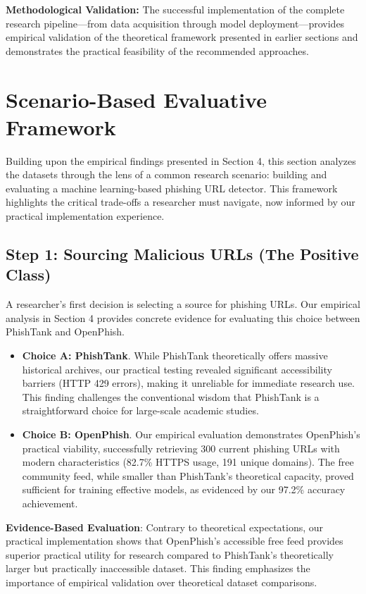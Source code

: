 \documentclass[journal,article,submit,pdftex,moreauthors]{Definitions/mdpi}
\begin{document}
\textbf{Methodological Validation:} The successful implementation of the complete research pipeline—from data acquisition through model deployment—provides empirical validation of the theoretical framework presented in earlier sections and demonstrates the practical feasibility of the recommended approaches.

\section{Scenario-Based Evaluative Framework}

Building upon the empirical findings presented in Section 4, this section analyzes the datasets through the lens of a common research scenario: building and evaluating a machine learning-based phishing URL detector. This framework highlights the critical trade-offs a researcher must navigate, now informed by our practical implementation experience.

\subsection{Step 1: Sourcing Malicious URLs (The Positive Class)}

A researcher's first decision is selecting a source for phishing URLs. Our empirical analysis in Section 4 provides concrete evidence for evaluating this choice between PhishTank and OpenPhish.

\begin{itemize}
\item \textbf{Choice A: PhishTank}. While PhishTank theoretically offers massive historical archives, our practical testing revealed significant accessibility barriers (HTTP 429 errors), making it unreliable for immediate research use. This finding challenges the conventional wisdom that PhishTank is a straightforward choice for large-scale academic studies.
\item \textbf{Choice B: OpenPhish}. Our empirical evaluation demonstrates OpenPhish's practical viability, successfully retrieving 300 current phishing URLs with modern characteristics (82.7\% HTTPS usage, 191 unique domains). The free community feed, while smaller than PhishTank's theoretical capacity, proved sufficient for training effective models, as evidenced by our 97.2\% accuracy achievement.
\end{itemize}

\textbf{Evidence-Based Evaluation}: Contrary to theoretical expectations, our practical implementation shows that OpenPhish's accessible free feed provides superior practical utility for research compared to PhishTank's theoretically larger but practically inaccessible dataset. This finding emphasizes the importance of empirical validation over theoretical dataset comparisons.
\end{document}
